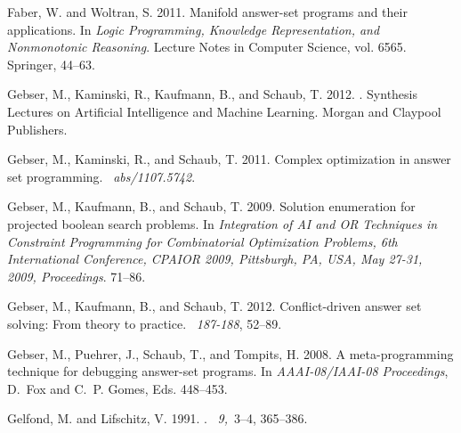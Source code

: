 \begin{thebibliography}{}
{\sc Faber, W.} {\sc and} {\sc Woltran, S.} 2011.
\newblock Manifold answer-set programs and their applications.
\newblock In {\em Logic Programming, Knowledge Representation, and Nonmonotonic
  Reasoning}. Lecture Notes in Computer Science, vol. 6565. Springer, 44--63.

{\sc Gebser, M.}, {\sc Kaminski, R.}, {\sc Kaufmann, B.}, {\sc and} {\sc
  Schaub, T.} 2012.
.
\newblock Synthesis Lectures on Artificial Intelligence and Machine Learning.
  Morgan and Claypool Publishers.

{\sc Gebser, M.}, {\sc Kaminski, R.}, {\sc and} {\sc Schaub, T.} 2011.
\newblock Complex optimization in answer set programming.
~{\em abs/1107.5742}.

{\sc Gebser, M.}, {\sc Kaufmann, B.}, {\sc and} {\sc Schaub, T.} 2009.
\newblock Solution enumeration for projected boolean search problems.
\newblock In {\em Integration of {AI} and {OR} Techniques in Constraint
  Programming for Combinatorial Optimization Problems, 6th International
  Conference, {CPAIOR} 2009, Pittsburgh, PA, USA, May 27-31, 2009,
  Proceedings}. 71--86.

{\sc Gebser, M.}, {\sc Kaufmann, B.}, {\sc and} {\sc Schaub, T.} 2012.
\newblock Conflict-driven answer set solving: From theory to practice.
~{\em 187-188}, 52--89.

{\sc Gebser, M.}, {\sc Puehrer, J.}, {\sc Schaub, T.}, {\sc and} {\sc Tompits,
  H.} 2008.
\newblock A meta-programming technique for debugging answer-set programs.
\newblock In {\em {AAAI}-{08/IAAI}-08 Proceedings}, {D.~Fox} {and} {C.~P.
  Gomes}, Eds. 448--453.

{\sc Gelfond, M.} {\sc and} {\sc Lifschitz, V.} 1991.
.
~{\em 9,\/}~3--4, 365--386.


\end{thebibliography}
